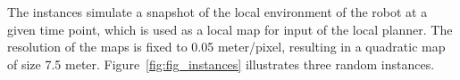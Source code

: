 The instances simulate a snapshot of the local environment of the robot at a given time point, which is used as a local map for input of the local planner.
The resolution of the maps is fixed to 0.05 meter/pixel, resulting in a quadratic map of size 7.5 meter. Figure~\ref{fig:fig_instances} illustrates three random instances. 
\begin{figure}[thpb]
     \footnotesize
      \centering
      \myfloatalign
      \setlength\fboxsep{0pt}
      \setlength\fboxrule{0.5pt}
       \\ 
\end{figure}
